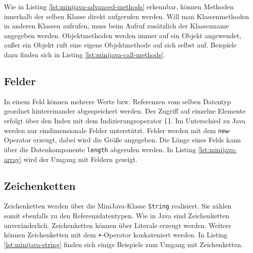 

Wie in Listing \ref{lst:minijava-advanced-methods} erkennbar, können Methoden innerhalb der selben Klasse direkt aufgerufen werden. Will man Klassenmethoden in anderen Klassen aufrufen, muss beim Aufruf zusätzlich der Klassenname angegeben werden. Objektmethoden werden immer auf ein Objekt angewendet, außer ein Objekt ruft eine eigene Objektmethode auf sich selbst auf. Beispiele dazu finden sich in Listing \ref{lst:minijava-call-methods}.



\subsection{Felder}
\label{subsec:MiniJava-Felder}

In einem Feld können mehrere Werte bzw. Referenzen vom selben Datentyp geordnet hintereinander abgespeichert werden. Der Zugriff auf einzelne Elemente erfolgt über den Index mit dem Indizierungsoperator \lstinline{[]}. Im Unterschied zu Java werden nur eindimensionale Felder unterstützt. Felder werden mit dem \lstinline{new}-Operator erzeugt, dabei wird die Größe angegeben. Die Länge eines Felds kann über die Datenkomponente \lstinline{length} abgerufen werden. In Listing \ref{lst:minijava-array} wird der Umgang mit Feldern gezeigt.

\pagebreak


\subsection{Zeichenketten}
\label{subsec:MiniJava-Zeichenketten}

Zeichenketten werden über die MiniJava-Klasse \lstinline{String} realisiert. Sie zählen somit ebenfalls zu den Referenzdatentypen. Wie in Java sind Zeichenketten unveränderlich. Zeichenketten können über Literale erzeugt werden. Weiters können Zeichenketten mit dem \lstinline{+}-Operator konkateniert werden. In Listing \ref{lst:minijava-string} finden sich einige Beispiele zum Umgang mit Zeichenketten.



